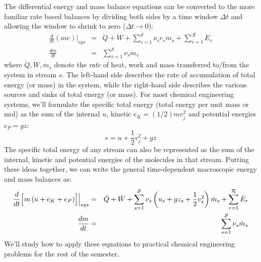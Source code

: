 \documentclass[11pt]{article}
\theoremstyle{definition}
\begin{document}
The differential energy and mass balance equations can be converted to
the more familiar rate based balances by dividing both sides by a time window $\Delta{t}$ and allowing the window to shrink to zero ($\Delta{t}\rightarrow{0}$):
\begin{eqnarray}
\frac{d}{dt}\left(me\right)\Bigr|_{sys} &=& \dot{Q}+\dot{W}+\sum_{s=1}^{\mathcal{S}}\nu_{s}e_{s}\dot{m}_{s}+ \sum_{r=1}^{\mathcal{R}}\dot{E}_{r}\\
\frac{dm}{dt} &=& \sum_{s=1}^{\mathcal{S}}\nu_{s}\dot{m}_{s}
\end{eqnarray}where $\dot{Q},\dot{W},\dot{m}_{s}$ denote the \textit{rate} of heat, work and mass transferred to/from the system in stream $s$.
The left-hand side describes the rate of accumulation of total energy (or mass) in the system, while the right-hand side describes the various sources and sinks of total energy (or mass).
For most chemical engineering systems, we'll formulate the specific total energy (total energy per unit mass or mol) as the sum of the internal $u$, kinetic $e_{K}=(1/2)mv_{j}^{2}$ and potential energies $e_{P}=gz$:
\begin{equation}
e = u + \frac{1}{2}v_{j}^{2} + gz
\end{equation}The specific total energy of any stream can also be represented as the sum of the internal, kinetic and potential energies of the molecules in that stream.
Putting these ideas together, we can write the general time-dependent macroscopic energy and mass balances as:
\begin{eqnarray}\label{eqn:general-open-balance}
	\frac{d}{dt}\Bigl[m\left(u+e_{K}+e_{P}\right)\Bigr]\Bigr|_{sys} &=& \dot{Q}+\dot{W}+\sum_{s=1}^{\mathcal{S}}\nu_{s}\left(u_{s}+gz_{s}+\frac{1}{2}v_{s}^{2}\right)\dot{m}_{s}+\sum_{r=1}^{\mathcal{R}}\dot{E}_{r}\\\label{eqn:total-mass-balance}
	\frac{dm}{dt} &=& \sum_{s=1}^{\mathcal{S}}\nu_{s}\dot{m}_{s}
\end{eqnarray}
We'll study how to apply these equations to practical chemical engineering problems for the rest of the semester.
\end{document}
